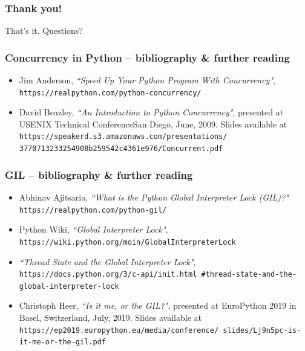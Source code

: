 \documentclass{beamer}
\begin{document}
    \begin{frame}
        \frametitle{Thank you!}
        \centering
        That's it. Questions?
    \end{frame}

    \begin{frame}
        \frametitle{Concurrency in Python -- bibliography \& further reading}

        \begin{itemize}
            \item<1-> Jim Anderson, \emph{``Speed Up Your Python Program With Concurrency"},
            \texttt{https://realpython.com/python-concurrency/}
            \item<1-> David Beazley, \emph{``An Introduction to Python Concurrency"},
                presented at USENIX Technical ConferenceSan Diego, June, 2009.
                Slides available at \texttt{https://speakerd.s3.amazonaws.com/presentations/
            3770713233254908b259542c4361e976/Concurrent.pdf}
        \end{itemize}
    \end{frame}

    \begin{frame}
        \frametitle{GIL -- bibliography \& further reading}
        \begin{itemize}
            \item<1-> Abhinav Ajitsaria, \emph{``What is the Python Global Interpreter Lock (GIL)?"}
            \texttt{https://realpython.com/python-gil/}
            \item<1-> Python Wiki, \emph{``Global Interpreter Lock"},
            \texttt{https://wiki.python.org/moin/GlobalInterpreterLock}
            \item<1-> \emph{``Thread State and the Global Interpreter Lock"},
            \texttt{https://docs.python.org/3/c-api/init.html
            \#thread-state-and-the-global-interpreter-lock}
            \item<1-> Christoph Heer, \emph{``Is it me, or the GIL?"}, presented at
            EuroPython 2019 in Basel, Switzerland, July, 2019.
            Slides available at \texttt{https://ep2019.europython.eu/media/conference/
            slides/Lj9n5pc-is-it-me-or-the-gil.pdf}
        \end{itemize}

    \end{frame}
\end{document}
